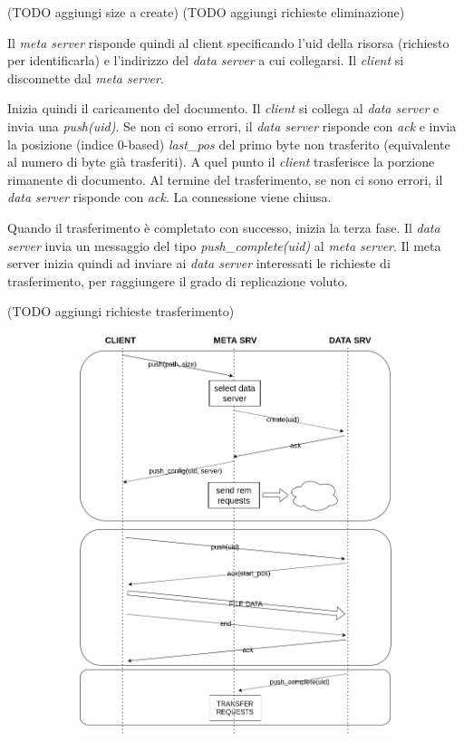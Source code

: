\documentclass{article}
\begin{document}
(TODO aggiungi size a create)
(TODO aggiungi richieste eliminazione)

Il \textit{meta server} risponde quindi al client specificando l'uid della risorsa (richiesto per identificarla) e l'indirizzo del \textit{data server} a cui collegarsi. Il \textit{client} si disconnette dal \textit{meta server}.

Inizia quindi il caricamento del documento. Il \textit{client} si collega al \textit{data server} e invia una \textit{push(uid)}. Se non ci sono errori, il \textit{data server} risponde con \textit{ack} e invia la posizione (indice 0-based) \textit{last\_pos} del primo byte non trasferito (equivalente al numero di byte già trasferiti). A quel punto il \textit{client} trasferisce la porzione rimanente di documento. Al termine del trasferimento, se non ci sono errori, il \textit{data server} risponde con \textit{ack}. La connessione viene chiusa.

Quando il trasferimento è completato con successo, inizia la terza fase. Il \textit{data server} invia un messaggio del tipo \textit{push\_complete(uid)} al \textit{meta server}. Il meta server inizia quindi ad inviare ai \textit{data server} interessati le richieste di trasferimento, per raggiungere il grado di replicazione voluto.

(TODO aggiungi richieste trasferimento)

\begin{figure}[H]
	\centering
	\begin{subfigure}{0.80\linewidth}
		\includegraphics[width=\linewidth]{../diagrams/requests/push_request.png}
	\end{subfigure}
\end{figure}
\end{document}
